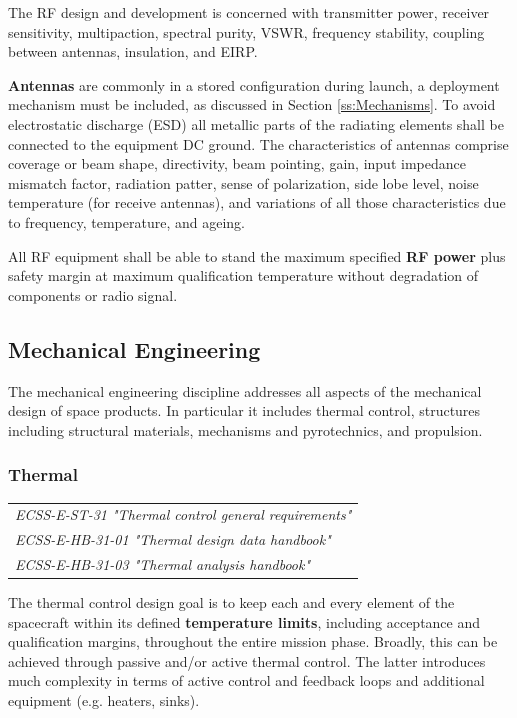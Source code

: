 The RF design and development is concerned with transmitter power, receiver sensitivity, multipaction, spectral purity, VSWR, frequency stability, coupling between antennas, insulation, and EIRP.

\textbf{Antennas} are commonly in a stored configuration during launch, a deployment mechanism must be included, as discussed in Section \ref{ss:Mechanisms}. To avoid electrostatic discharge (ESD) all metallic parts of the radiating elements shall be connected to the equipment DC ground. The characteristics of antennas comprise coverage or beam shape, directivity, beam pointing, gain, input impedance mismatch factor, radiation patter, sense of polarization, side lobe level, noise temperature (for receive antennas), and variations of all those characteristics due to frequency, temperature, and ageing.

All RF equipment shall be able to stand the maximum specified \textbf{RF power} plus safety margin at maximum qualification temperature without degradation of components or radio signal. 

\subsection{Mechanical Engineering}
\label{ss:Mechanical Engineering}

The mechanical engineering discipline addresses all aspects of the mechanical design of space products. In particular it includes thermal control, structures including structural materials, mechanisms and pyrotechnics, and propulsion.

\subsubsection{Thermal}

\begin{tabular}{l}
\textit{ECSS-E-ST-31 "Thermal control general requirements" \cite{ECSS-E-ST-31}} \\
\textit{ECSS-E-HB-31-01 "Thermal design data handbook" \cite{ECSS-E-HB-31-01}} \\
\textit{ECSS-E-HB-31-03 "Thermal analysis handbook" \cite{ECSS-E-HB-31-01}}
\end{tabular}

The thermal control design goal is to keep each and every element of the spacecraft within its defined \textbf{temperature limits}, including acceptance and qualification margins, throughout the entire mission phase. Broadly, this can be achieved through passive and/or active thermal control. The latter introduces much complexity in terms of active control and feedback loops and additional equipment (e.g. heaters, sinks).

